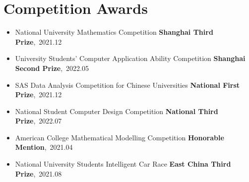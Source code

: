 \documentclass{resume}
\begin{document}
\section{Competition Awards}
\begin{itemize}[parsep=0.2ex]
  \item National University Mathematics Competition \textbf{Shanghai Third Prize},\ 2021.12
  \item University Students' Computer Application Ability Competition \textbf{Shanghai Second Prize},\ 2022.05
  \item  SAS Data Analysis Competition for Chinese Universities \textbf{National First Prize},\ 2021.12

  \item National Student Computer Design Competition  \textbf{National Third Prize},\ 2022.07
  \item American College Mathematical Modelling Competition \textbf{Honorable Mention},\ 2021.04
  \item National University Students Intelligent Car Race  \textbf{ East China Third Prize},\ 2021.08

\end{itemize}




\end{document}
